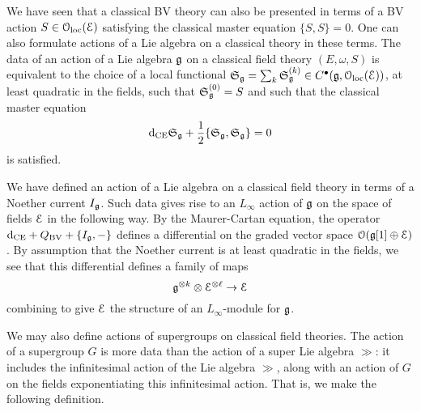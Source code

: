 \documentclass[10pt, oneside]{article}
\begin{document}
\begin{rmk}
\end{rmk}

\begin{rmk}
We have seen that a classical BV theory can also be presented in terms of a BV action $S \in \mathcal{O}_{\rm loc}(\mathcal E)$ satisfying the classical master equation $\{S, S\} = 0$. 
One can also formulate actions of a Lie algebra on a classical theory in these terms. 
The data of an action of a Lie algebra $\mathfrak g$ on a classical field theory $(E, \omega, S)$ is equivalent to the choice of a local functional $\mathfrak S_\mathfrak g = \sum_k \mathfrak S_\mathfrak g^{(k)}\in C^\bullet(\mathfrak g, \mathcal{O}_{\rm loc}(\mathcal E))$, at least quadratic in the fields, such that $\mathfrak S^{(0)}_\mathfrak g = S$ and such that the classical master equation
\[
{\rm d}_{\mathrm{CE}} \mathfrak S_\mathfrak g + \frac{1}{2} \{\mathfrak S_\mathfrak g, \mathfrak S_\mathfrak g\} = 0 
\]
is satisfied.
\end{rmk}

\begin{rmk}
We have defined an action of a Lie algebra on a classical field theory in terms of a Noether current $I_\mathfrak g$.
Such data gives rise to an $L_\infty$ action of $\mathfrak g$ on the space of fields $\mathcal E$ in the following way.
By the Maurer-Cartan equation, the operator ${\rm d}_{\mathrm{CE}} + Q_{\mathrm{BV}} + \{I_\mathfrak g, -\}$ 
defines a differential on the graded vector space $\mathcal O(\mathfrak g[1] \oplus \mathcal E)$. 
By assumption that the Noether current is at least quadratic in the fields, we see that this differential defines a family of maps
\[
\mathfrak g^{\otimes k} \otimes \mathcal E^{\otimes \ell} \to \mathcal E
\]
combining to give $\mathcal E$ the structure of an $L_\infty$-module for $\mathfrak g$.
\end{rmk}

We may also define actions of supergroups on classical field theories.  The action of a supergroup $G$ is more data than the action of a super Lie algebra $\gg$: it includes the infinitesimal action of the Lie algebra $\gg$, along with an action of $G$ on the fields exponentiating this infinitesimal action.  That is, we make the following definition.
\end{document}
